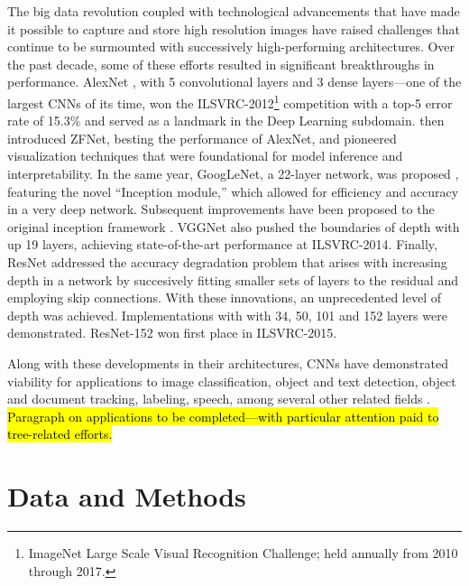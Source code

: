 \documentclass[11pt,twoside]{article}
\numberwithin{equation}{section}
\newcommand{\?}{\stackrel{?}{=}}
\begin{document}
The big data revolution coupled with technological advancements that have made it possible to capture and store high
resolution images have raised challenges that continue to be surmounted with successively high-performing
architectures. Over the past decade, some of these efforts resulted in significant breakthroughs in performance. AlexNet
\cite{krizhevsky2012imageneta}, with 5 convolutional layers and 3 dense layers---one of the largest CNNs of its time,
won the ILSVRC-2012\footnote{ImageNet Large Scale Visual Recognition Challenge; held annually from 2010 through 2017.}
competition with a top-5 error rate of 15.3\% and served as a landmark in the Deep Learning subdomain.
\citet{zeiler2014visualizing} then introduced ZFNet, besting the performance of AlexNet, and pioneered visualization
techniques that were foundational for model inference and interpretability.  In the same year, GoogLeNet, a 22-layer
network, was proposed \cite{szegedy2014going}, featuring the novel ``Inception module,'' which allowed for efficiency
and accuracy in a very deep network. Subsequent improvements have been proposed to the original inception framework
\cite{szegedy2015rethinking,szegedy2016inceptionv4}.  VGGNet \cite{simonyan2015very} also pushed the boundaries of depth
with up 19 layers, achieving state-of-the-art performance at ILSVRC-2014. Finally, ResNet \cite{he2015deep} addressed
the accuracy degradation problem that arises with increasing depth in a network by succesively fitting smaller sets of
layers to the residual and employing skip connections. With these innovations, an unprecedented level of depth was
achieved. Implementations with with 34, 50, 101 and 152 layers were demonstrated. ResNet-152 won first place in
ILSVRC-2015.

Along with these developments in their architectures, CNNs have demonstrated viability for applications to image
classification, object and text detection, object and document tracking, labeling, speech, among several other related
fields \cite{gu2018recent}. \hl{Paragraph on applications to be completed---with particular attention paid to tree-related efforts.}


\section{Data and Methods}
\end{document}
